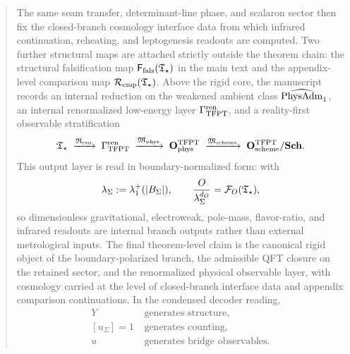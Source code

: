 \begin{abstract}
The same seam transfer, determinant-line phase, and scalaron sector then fix the closed-branch
cosmology interface data from which infrared continuation, reheating, and leptogenesis readouts are
computed. Two further structural maps are attached strictly outside the theorem chain: the
structural falsification map $\Ffals(\Tstar)$ in the main text and the appendix-level comparison
map $\Rcmp(\Tstar)$. Above the rigid core, the manuscript records an internal reduction on the
weakened ambient class $\PhysAdmOne$, an internal renormalized low-energy layer $\GrenTFPT$, and a
reality-first observable stratification
\[
\Tstar\;\xrightarrow{\Rren}\;\GrenTFPT\;\xrightarrow{\Mphys}\;\OphysTFPT
\;\xrightarrow{\Mscheme}\;\OschemeTFPT/\SchGrp.
\]
This output layer is read in boundary-normalized form: with
\[
\lambda_\Sigma:=\lambda_1^+(|B_\Sigma|),
\qquad
\frac{O}{\lambda_\Sigma^{d_O}}=\mathcal F_O(\Tstar),
\]
so dimensionless gravitational, electroweak, pole-mass, flavor-ratio, and infrared readouts are
internal branch outputs rather than external metrological inputs.
The final theorem-level claim is the canonical rigid object of the boundary-polarized branch, the
admissible QFT closure on the retained sector, and the renormalized physical observable layer, with
cosmology carried at the level of closed-branch interface data and appendix comparison
continuations. In the condensed decoder reading,
\[
\begin{aligned}
Y&\ \text{generates structure},\\
[u_\Sigma]=1&\ \text{generates counting},\\
u&\ \text{generates bridge observables}.
\end{aligned}
\]
\end{abstract}

